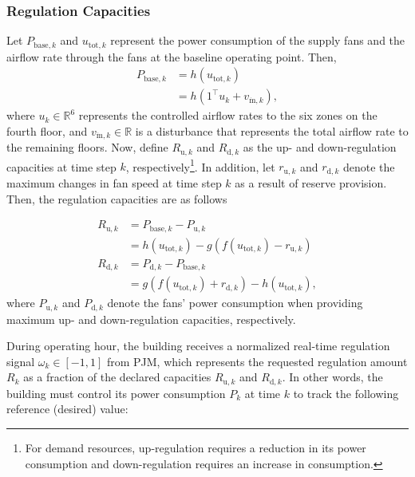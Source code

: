 
\subsubsection{Regulation Capacities}

Let $P_{\text{base},k}$ and $u_{\text{tot},k}$ represent the power consumption of the supply fans and the airflow rate through the fans at the baseline operating point. Then,
\begin{equation}\label{eq:P}
\begin{aligned}
P_{\text{base},k} &= h(u_{\text{tot},k})\\
&=h(1^\top u_k + v_{\dot{\text{m}},k}),
\end{aligned}
\end{equation}
where $u_k \in \mathbb{R}^6$ represents the controlled airflow rates to the six zones on the fourth floor, and $v_{\dot{\text{m}},k} \in \mathbb{R}$ is a disturbance that represents the total airflow rate to the remaining floors.
Now, define $R_{\text{u},k}$ and $R_{\text{d},k}$ as the up- and down-regulation capacities at time step $k$, respectively\footnote{For demand resources, up-regulation requires a reduction in its power consumption and down-regulation requires an increase in consumption.}. In addition, let $r_{\text{u},k}$ and $r_{\text{d},k}$ denote the maximum changes in fan speed at time step $k$ as a result of reserve provision. Then, the regulation capacities are as follows

\begin{equation}\label{eq:Ru_Rd}
\begin{aligned}
R_{\text{u},k} & = P_{\text{base},k} - P_{\text{u},k}\\
 & = h(u_{\text{tot},k}) - g(f(u_{\text{tot},k}) - r_{\text{u},k})\\
R_{\text{d},k} & = P_{\text{d},k} - P_{\text{base},k}\\
 & = g(f(u_{\text{tot},k}) + r_{\text{d},k}) - h(u_{\text{tot},k}),
\end{aligned}
\end{equation}
\noindent
where $P_{\text{u},k}$ and $P_{\text{d},k}$ denote the fans' power consumption when providing maximum up- and down-regulation capacities, respectively.

During operating hour, the building receives a normalized real-time regulation signal $\omega_k \in [-1,1]$ from PJM, which represents the requested regulation amount $R_k$ as a fraction of the declared capacities $R_{\text{u},k}$ and $R_{\text{d},k}$. In other words, the building must control its power consumption $P_k$ at time $k$ to track the following reference (desired) value:


